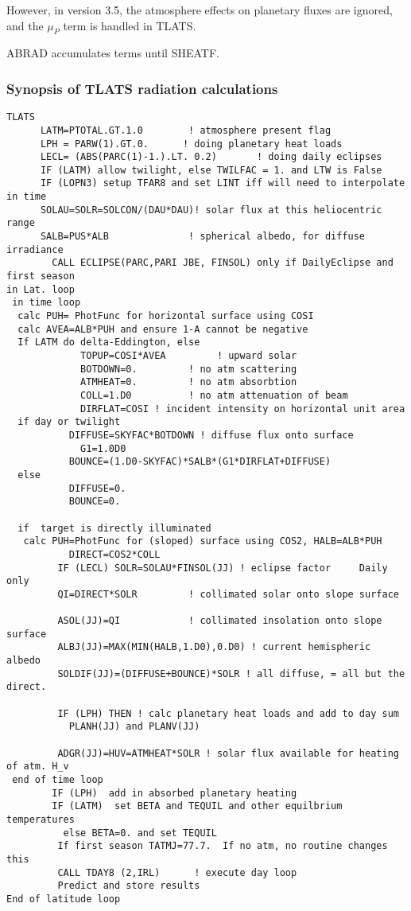 \documentclass{article}
\begin{document}
However, in version 3.5, the atmosphere effects on planetary fluxes are ignored,
and the $\mu_P$ term is handled in TLATS.

ABRAD accumulates terms until SHEATF.

\subsubsection{Synopsis of TLATS radiation calculations}
\begin{verbatim}
TLATS
      LATM=PTOTAL.GT.1.0        ! atmosphere present flag
      LPH = PARW(1).GT.0.      ! doing planetary heat loads
      LECL= (ABS(PARC(1)-1.).LT. 0.2)       ! doing daily eclipses
      IF (LATM) allow twilight, else TWILFAC = 1. and LTW is False
      IF (LOPN3) setup TFAR8 and set LINT iff will need to interpolate in time
      SOLAU=SOLR=SOLCON/(DAU*DAU)! solar flux at this heliocentric range
      SALB=PUS*ALB              ! spherical albedo, for diffuse irradiance
        CALL ECLIPSE(PARC,PARI JBE, FINSOL) only if DailyEclipse and first season
in Lat. loop
 in time loop
  calc PUH= PhotFunc for horizontal surface using COSI
  calc AVEA=ALB*PUH and ensure 1-A cannot be negative
  If LATM do delta-Eddington, else  
             TOPUP=COSI*AVEA         ! upward solar 
             BOTDOWN=0.         ! no atm scattering
             ATMHEAT=0.         ! no atm absorbtion
             COLL=1.D0          ! no atm attenuation of beam
             DIRFLAT=COSI ! incident intensity on horizontal unit area 
  if day or twilight 
           DIFFUSE=SKYFAC*BOTDOWN ! diffuse flux onto surface
             G1=1.0D0
           BOUNCE=(1.D0-SKYFAC)*SALB*(G1*DIRFLAT+DIFFUSE) 
  else 
           DIFFUSE=0.
           BOUNCE=0.

  if  target is directly illuminated
   calc PUH=PhotFunc for (sloped) surface using COS2, HALB=ALB*PUH
           DIRECT=COS2*COLL    
         IF (LECL) SOLR=SOLAU*FINSOL(JJ) ! eclipse factor     Daily only
         QI=DIRECT*SOLR         ! collimated solar onto slope surface

         ASOL(JJ)=QI            ! collimated insolation onto slope surface
         ALBJ(JJ)=MAX(MIN(HALB,1.D0),0.D0) ! current hemispheric albedo
         SOLDIF(JJ)=(DIFFUSE+BOUNCE)*SOLR ! all diffuse, = all but the direct.

         IF (LPH) THEN ! calc planetary heat loads and add to day sum
           PLANH(JJ) and PLANV(JJ)

         ADGR(JJ)=HUV=ATMHEAT*SOLR ! solar flux available for heating of atm. H_v
 end of time loop 
        IF (LPH)  add in absorbed planetary heating
        IF (LATM)  set BETA and TEQUIL and other equilbrium temperatures 
          else BETA=0. and set TEQUIL
         If first season TATMJ=77.7.  If no atm, no routine changes this
         CALL TDAY8 (2,IRL)      ! execute day loop
         Predict and store results
End of latitude loop

\end{verbatim}
 
\end{document}
